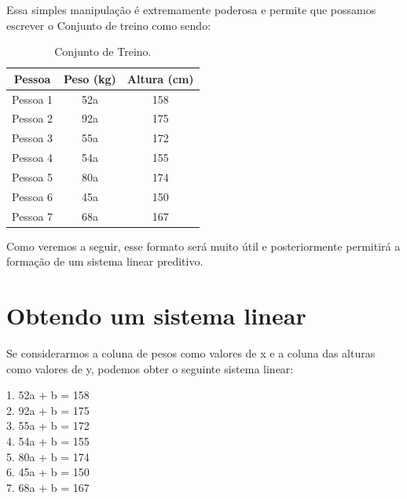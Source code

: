 \documentclass{article}
\begin{document}
    Essa simples manipulação é extremamente poderosa e permite que possamos escrever o Conjunto de treino como sendo: \\
    \begin{table}[ht]
        \centering
        \begin{tabular}{|c|c|c|}
        \hline
        \textbf{Pessoa} & \textbf{Peso (kg)} & \textbf{Altura (cm)} \\
        \hline
            Pessoa 1 & 52a & 158 \\
        \hline
            Pessoa 2 & 92a & 175 \\
        \hline
            Pessoa 3 & 55a & 172 \\
        \hline
            Pessoa 4 & 54a & 155 \\
        \hline
            Pessoa 5 & 80a & 174 \\
        \hline
            Pessoa 6 & 45a & 150 \\
        \hline
            Pessoa 7 & 68a & 167 \\
        \hline
        \end{tabular}
        \caption{Conjunto de Treino.}
        \label{tab:treino}
    \end{table}
    
    Como veremos a seguir, esse formato será muito útil e posteriormente permitirá a formação de um sistema linear preditivo.
    
\section{Obtendo um sistema linear}
    Se considerarmos a coluna de pesos como valores de x e a
    coluna das alturas como valores de y, podemos obter o seguinte sistema linear:
    \begin{center}
        1. \quad 52a + b = 158 \\
        2. \quad 92a + b = 175 \\
        3. \quad 55a + b = 172 \\
        4. \quad 54a + b = 155 \\
        5. \quad 80a + b = 174 \\
        6. \quad 45a + b = 150 \\
        7. \quad 68a + b = 167 \\
    \end{center}


\end{document}
